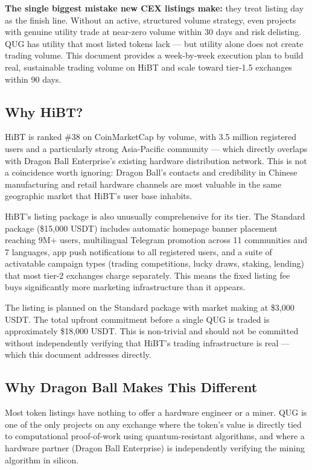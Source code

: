 \documentclass[11pt,a4paper]{article}
\begin{document}
\begin{tcolorbox}[greenbox]
\textbf{The single biggest mistake new CEX listings make:} they treat listing day as the finish line. Without an active, structured volume strategy, even projects with genuine utility trade at near-zero volume within 30 days and risk delisting. QUG has utility that most listed tokens lack — but utility alone does not create trading volume. This document provides a week-by-week execution plan to build real, sustainable trading volume on HiBT and scale toward tier-1.5 exchanges within 90 days.
\end{tcolorbox}

\subsection{Why HiBT?}

HiBT is ranked \#38 on CoinMarketCap by volume, with 3.5 million registered users and a particularly strong Asia-Pacific community — which directly overlaps with Dragon Ball Enterprise's existing hardware distribution network. This is not a coincidence worth ignoring: Dragon Ball's contacts and credibility in Chinese manufacturing and retail hardware channels are most valuable in the same geographic market that HiBT's user base inhabits.

HiBT's listing package is also unusually comprehensive for its tier. The Standard package (\$15,000 USDT) includes automatic homepage banner placement reaching 9M+ users, multilingual Telegram promotion across 11 communities and 7 languages, app push notifications to all registered users, and a suite of activatable campaign types (trading competitions, lucky draws, staking, lending) that most tier-2 exchanges charge separately. This means the fixed listing fee buys significantly more marketing infrastructure than it appears.

The listing is planned on the Standard package with market making at \$3,000 USDT. The total upfront commitment before a single QUG is traded is approximately \$18,000 USDT. This is non-trivial and should not be committed without independently verifying that HiBT's trading infrastructure is real — which this document addresses directly.

\subsection{Why Dragon Ball Makes This Different}

Most token listings have nothing to offer a hardware engineer or a miner. QUG is one of the only projects on any exchange where the token's value is directly tied to computational proof-of-work using quantum-resistant algorithms, and where a hardware partner (Dragon Ball Enterprise) is independently verifying the mining algorithm in silicon.
\end{document}
